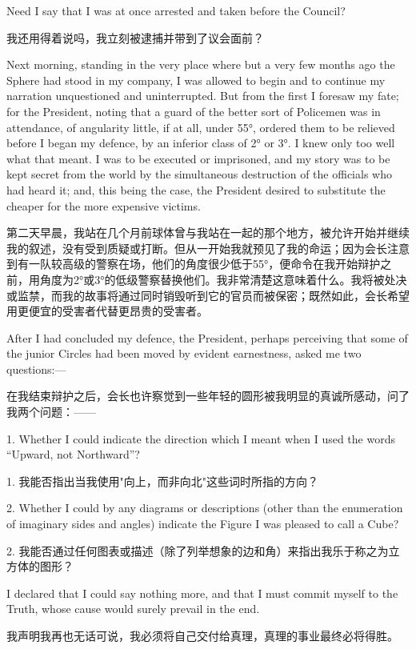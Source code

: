 \documentclass[12pt,UTF8]{ctexbook}
\begin{document}
Need I say that I was at once arrested and taken before the Council?

我还用得着说吗，我立刻被逮捕并带到了议会面前？

Next morning, standing in the very place where but a very few months ago the Sphere had stood in my company, I was allowed to begin and to continue my narration unquestioned and uninterrupted. But from the first I foresaw my fate; for the President, noting that a guard of the better sort of Policemen was in attendance, of angularity little, if at all, under 55°, ordered them to be relieved before I began my defence, by an inferior class of 2° or 3°. I knew only too well what that meant. I was to be executed or imprisoned, and my story was to be kept secret from the world by the simultaneous destruction of the officials who had heard it; and, this being the case, the President desired to substitute the cheaper for the more expensive victims.

第二天早晨，我站在几个月前球体曾与我站在一起的那个地方，被允许开始并继续我的叙述，没有受到质疑或打断。但从一开始我就预见了我的命运；因为会长注意到有一队较高级的警察在场，他们的角度很少低于55°，便命令在我开始辩护之前，用角度为2°或3°的低级警察替换他们。我非常清楚这意味着什么。我将被处决或监禁，而我的故事将通过同时销毁听到它的官员而被保密；既然如此，会长希望用更便宜的受害者代替更昂贵的受害者。

After I had concluded my defence, the President, perhaps perceiving that some of the junior Circles had been moved by evident earnestness, asked me two questions:---

在我结束辩护之后，会长也许察觉到一些年轻的圆形被我明显的真诚所感动，问了我两个问题：——

1. Whether I could indicate the direction which I meant when I used the words ``Upward, not Northward''?

1. 我能否指出当我使用"向上，而非向北"这些词时所指的方向？

2. Whether I could by any diagrams or descriptions (other than the enumeration of imaginary sides and angles) indicate the Figure I was pleased to call a Cube?

2. 我能否通过任何图表或描述（除了列举想象的边和角）来指出我乐于称之为立方体的图形？

I declared that I could say nothing more, and that I must commit myself to the Truth, whose cause would surely prevail in the end.

我声明我再也无话可说，我必须将自己交付给真理，真理的事业最终必将得胜。
\end{document}
